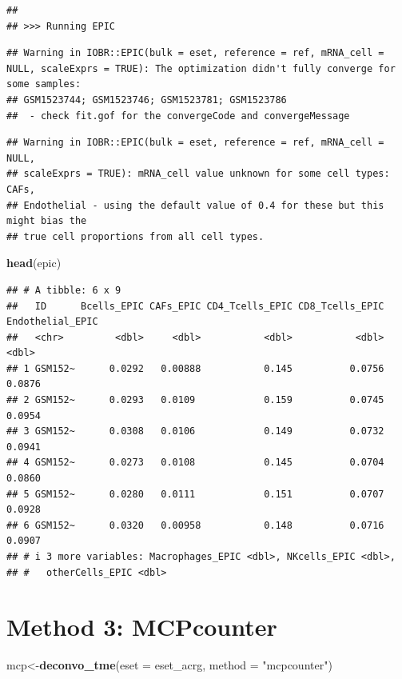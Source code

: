 \documentclass[
  12pt,
]{book}
\newenvironment{Shaded}{\begin{snugshade}}{\end{snugshade}}
\newcommand{\AttributeTok}[1]{\textcolor[rgb]{0.13,0.29,0.53}{#1}}
\newcommand{\FunctionTok}[1]{\textcolor[rgb]{0.13,0.29,0.53}{\textbf{#1}}}
\newcommand{\NormalTok}[1]{#1}
\newcommand{\OtherTok}[1]{\textcolor[rgb]{0.56,0.35,0.01}{#1}}
\newcommand{\StringTok}[1]{\textcolor[rgb]{0.31,0.60,0.02}{#1}}
\begin{document}
\begin{verbatim}
## 
## >>> Running EPIC
\end{verbatim}

\begin{verbatim}
## Warning in IOBR::EPIC(bulk = eset, reference = ref, mRNA_cell = NULL, scaleExprs = TRUE): The optimization didn't fully converge for some samples:
## GSM1523744; GSM1523746; GSM1523781; GSM1523786
##  - check fit.gof for the convergeCode and convergeMessage
\end{verbatim}

\begin{verbatim}
## Warning in IOBR::EPIC(bulk = eset, reference = ref, mRNA_cell = NULL,
## scaleExprs = TRUE): mRNA_cell value unknown for some cell types: CAFs,
## Endothelial - using the default value of 0.4 for these but this might bias the
## true cell proportions from all cell types.
\end{verbatim}

\begin{Shaded}
\begin{Highlighting}[]
\FunctionTok{head}\NormalTok{(epic)}
\end{Highlighting}
\end{Shaded}

\begin{verbatim}
## # A tibble: 6 x 9
##   ID      Bcells_EPIC CAFs_EPIC CD4_Tcells_EPIC CD8_Tcells_EPIC Endothelial_EPIC
##   <chr>         <dbl>     <dbl>           <dbl>           <dbl>            <dbl>
## 1 GSM152~      0.0292   0.00888           0.145          0.0756           0.0876
## 2 GSM152~      0.0293   0.0109            0.159          0.0745           0.0954
## 3 GSM152~      0.0308   0.0106            0.149          0.0732           0.0941
## 4 GSM152~      0.0273   0.0108            0.145          0.0704           0.0860
## 5 GSM152~      0.0280   0.0111            0.151          0.0707           0.0928
## 6 GSM152~      0.0320   0.00958           0.148          0.0716           0.0907
## # i 3 more variables: Macrophages_EPIC <dbl>, NKcells_EPIC <dbl>,
## #   otherCells_EPIC <dbl>
\end{verbatim}

\hypertarget{method-3-mcpcounter}{%
\section{Method 3: MCPcounter}\label{method-3-mcpcounter}}

\begin{Shaded}
\begin{Highlighting}[]
\NormalTok{mcp}\OtherTok{\textless{}{-}}\FunctionTok{deconvo\_tme}\NormalTok{(}\AttributeTok{eset =}\NormalTok{ eset\_acrg, }\AttributeTok{method =} \StringTok{"mcpcounter"}\NormalTok{)}
\end{Highlighting}
\end{Shaded}
\end{document}

